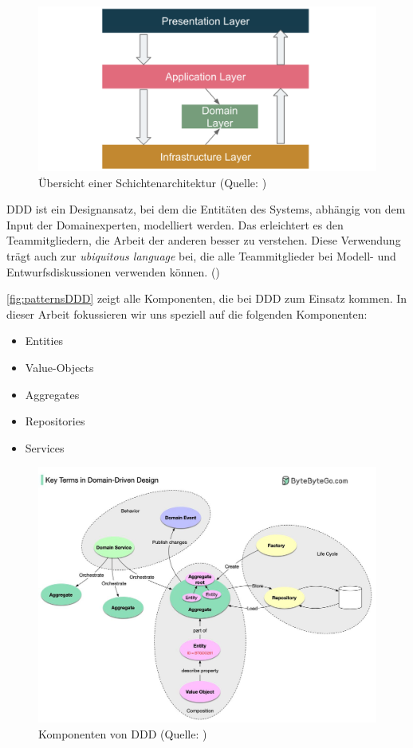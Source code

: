 \documentclass[a4paper, fontsize=11pt, parskip=half, twoside]{scrreprt}
\begin{document}
	\begin{figure}[ht]
		\centering
		\includegraphics[scale=0.5]{assets/layeredArchitecture.png}
		\caption{Übersicht einer Schichtenarchitektur (Quelle: \textcite{zhang_domain_nodate})}
		\label{fig:layeredArchitecture}
	\end{figure}
	
	\ac{DDD} ist ein Designansatz, bei dem die Entitäten des Systems, abhängig von dem Input der Domainexperten, modelliert werden.
	Das erleichtert es den Teammitgliedern, die Arbeit der anderen besser zu verstehen.
	Diese Verwendung trägt auch zur \emph{ubiquitous language} bei, die alle Teammitglieder bei Modell- und Entwurfsdiskussionen verwenden können. (\textcite{vernon_implementing_2013})
	
	\autoref{fig:patternsDDD} zeigt alle Komponenten, die bei \ac{DDD} zum Einsatz kommen. 
	In dieser Arbeit fokussieren wir uns speziell auf die folgenden Komponenten:
	
	\begin{itemize}
		\setlength\itemsep{-0.5em}
		\item Entities 
		\item Value-Objects
		\item Aggregates
		\item Repositories
		\item Services
	\end{itemize}
	
	\begin{figure}[ht]
		\centering
		\includegraphics[scale=0.32]{assets/componentsDDD.jpg}
		\caption{Komponenten von \ac{DDD} (Quelle: \textcite{xu_ep32_2023})}
		\label{fig:patternsDDD}
	\end{figure}
\end{document}
